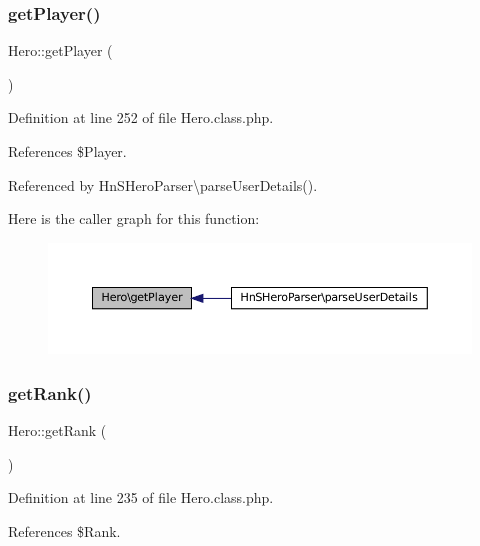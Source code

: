 \subsubsection{\texorpdfstring{get\+Player()}{getPlayer()}}
{\footnotesize\ttfamily Hero\+::get\+Player (\begin{DoxyParamCaption}{ }\end{DoxyParamCaption})}



Definition at line 252 of file Hero.\+class.\+php.



References \$\+Player.



Referenced by Hn\+S\+Hero\+Parser\textbackslash{}parse\+User\+Details().

Here is the caller graph for this function\+:\nopagebreak
\begin{figure}[H]
\begin{center}
\leavevmode
\includegraphics[width=350pt]{class_hero_a4d4e2d1cbefca5ae1445a495cbba43c2_icgraph}
\end{center}
\end{figure}
\mbox{\label{class_hero_a3797e214969c182e6597efd83b8c7cc7}} 
\subsubsection{\texorpdfstring{get\+Rank()}{getRank()}}
{\footnotesize\ttfamily Hero\+::get\+Rank (\begin{DoxyParamCaption}{ }\end{DoxyParamCaption})}



Definition at line 235 of file Hero.\+class.\+php.



References \$\+Rank.

\mbox{\label{class_hero_af53e2ac1b681edd8aa5df9e7ff3ded9f}} 
